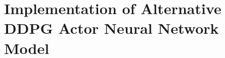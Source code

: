 \section{Implementation of Alternative DDPG Actor Neural Network Model}\label{app:implementation_alt_actor_model}

